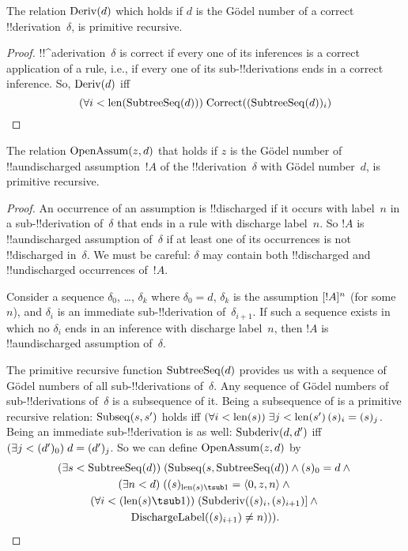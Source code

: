 \documentclass[../../../include/open-logic-section]{subfiles}
\begin{document}
\begin{prop}
  The relation $\mathrm{Deriv}(d)$ which holds if $d$ is the G\"odel
  number of a correct !!{derivation}~$\delta$, is primitive recursive.
\end{prop}

\begin{proof}
  !!^a{derivation}~$\delta$ is correct if every one of its inferences
  is a correct application of a rule, i.e., if every one of its
  sub-!!{derivation}s ends in a correct inference. So, $\mathrm{Deriv}(d)$
  iff
  \[
  (\forall i<\mathrm{len}(\mathrm{SubtreeSeq}(d)))\; \mathrm{Correct}((\mathrm{SubtreeSeq}(d))_i)
  \]
\end{proof}

\begin{prop}
   The relation $\mathrm{OpenAssum}(z, d)$ that
  holds if $z$ is the G\"odel number of !!a{undischarged} assumption~$!A$
  of the !!{derivation}~$\delta$ with G\"odel number~$d$, is primitive
  recursive.
\end{prop}

\begin{proof}
  An occurrence of an assumption is !!{discharged} if it occurs with
  label~$n$ in a sub-!!{derivation} of~$\delta$ that ends in a rule
  with discharge label~$n$. So $!A$ is !!a{undischarged} assumption
  of~$\delta$ if at least one of its occurrences is not !!{discharged}
  in~$\delta$. We must be careful: $\delta$ may contain both
  !!{discharged} and !!{undischarged} occurrences of~$!A$.

  Consider a sequence $\delta_0$, \dots, $\delta_k$ where $\delta_0 =
  d$, $\delta_k$ is the assumption $[!A]^{n}$ (for some~$n$),
  and $\delta_{i}$ is an immediate sub-!!{derivation}
  of~$\delta_{i+1}$. If such a sequence exists in which no $\delta_i$
  ends in an inference with discharge label~$n$, then $!A$ is
  !!a{undischarged} assumption of~$\delta$.

  The primitive recursive function $\mathrm{SubtreeSeq}(d)$ provides us
  with a sequence of G\"odel numbers of all sub-!!{derivation}s
  of~$\delta$. Any sequence of G\"odel numbers of sub-!!{derivation}s
  of~$\delta$ is a subsequence of it. Being a subsequence of is a
  primitive recursive relation: $\mathrm{Subseq}(s, s')$ holds iff
  $\bforall{i<\len{s}}{\lexists[j<\len{s'}][(s)_i = (s)_j]}$. Being an
  immediate sub-!!{derivation} is as well: $\mathrm{Subderiv}(d, d')$ iff
  $(\exists j<(d')_0)\; d = (d')_j$. So we can define
  $\mathrm{OpenAssum}(z, d)$ by
  \begin{multline*}
    \bexists{s<\fn{SubtreeSeq}(d)}{(\fn{Subseq}(s, \fn{SubtreeSeq}(d))
      \land (s)_0 = d \land {}} \\
    \bexists{n<d}{((s)_{\len{s} \tsub 1} = \tuple{0, z, n} \land {}}\\
      \bforall{i<(\len{s} \tsub 1)}{(\fn{Subderiv}((s)_i, (s)_{i+1})] \land {}}\\
      \fn{DischargeLabel}((s)_{i+1}) \neq n))).
  \end{multline*}
\end{proof}
\end{document}
